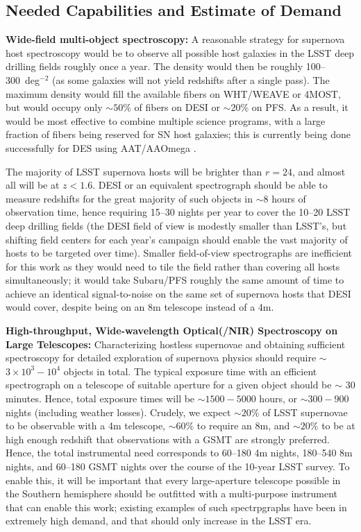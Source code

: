 \subsection{Needed Capabilities and Estimate of Demand}

{\bf Wide-field multi-object spectroscopy:}  A reasonable strategy for supernova host spectroscopy would be to observe all possible host galaxies in the LSST deep drilling fields 
roughly once a year.  The density would then be roughly
100--300~deg$^{-2}$ (as some galaxies will not yield redshifts after a
single pass).  The maximum density would fill the available fibers on WHT/WEAVE or 4MOST, but would occupy only $\sim 50\%$ of fibers on DESI or $\sim 20\%$ on PFS.    As a result, it would be most effective to combine multiple science programs, with a large fraction of fibers being reserved for SN host galaxies; this is
currently being done successfully for DES using AAT/AAOmega
\citep{Yuan15}.

The majority of LSST supernova hosts will be brighter than $r=24$, and almost all will be at $z<1.6$.  DESI or an equivalent spectrograph should be able to measure redshifts for the great majority of such objects in $\sim 8$ hours of observation time, hence requiring 15--30 nights per year to cover the 10--20 LSST deep drilling fields (the DESI field of view is modestly smaller than LSST's, but shifting field centers for each year's campaign should enable the vast majority of hosts to be targeted over time).  Smaller field-of-view spectrographs are inefficient for this work as they would need to tile the field rather than covering all hosts simultaneously; it would take Subaru/PFS roughly the same amount of time to achieve an identical signal-to-noise on the same set of supernova hosts that DESI would cover, despite being on an 8m telescope instead of a 4m.  

{\bf High-throughput, Wide-wavelength Optical(/NIR) Spectroscopy on Large Telescopes:}  Characterizing hostless supernovae and obtaining sufficient spectroscopy for detailed exploration of supernova physics should require $\sim$ $3\times10^3 -10^4$ objects in total.  The typical exposure time with an efficient spectrograph on a telescope of suitable aperture for a given object should be $\sim$ 30 minutes.  Hence, total exposure times will be $\sim 1500-5000$ hours, or $\sim 300-900$ nights (including weather losses).  Crudely, we expect $\sim 20\%$ of LSST supernovae to be observable with a 4m telescope, $\sim 60\%$ to require an 8m, and $\sim 20\%$ to be at high enough redshift that observations with a GSMT are strongly preferred.  Hence, the total instrumental need corresponds to 60--180 4m nights, 180--540 8m nights, and 60--180 GSMT nights over the course of the 10-year LSST survey.  To enable this, it will be important that every large-aperture telescope possible in the Southern hemisphere should be outfitted with a multi-purpose instrument that can enable this work; existing examples of such spectrpgraphs have been in extremely high demand, and that should only increase in the LSST era.

